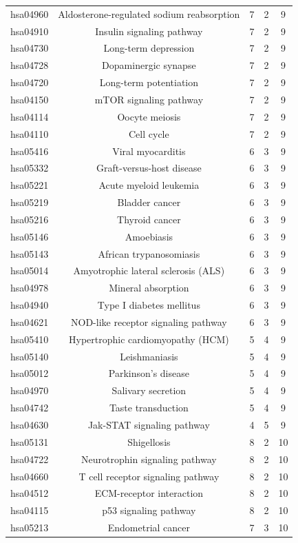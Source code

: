 \begin{center}
\begin{longtable}{@{}ccccc@{}}
hsa04960	&Aldosterone-regulated sodium reabsorption&	7&	2&	9\\
hsa04910	&Insulin signaling pathway&	7&	2&	9\\
hsa04730	&Long-term depression&	7&	2&	9\\
hsa04728	&Dopaminergic synapse&	7&	2&	9\\
hsa04720	&Long-term potentiation&	7&	2&	9\\
hsa04150	&mTOR signaling pathway&	7&	2&	9\\
hsa04114	&Oocyte meiosis&	7&	2&	9\\
hsa04110	&Cell cycle&	7&	2&	9\\
hsa05416	&Viral myocarditis&	6&	3&	9\\
hsa05332	&Graft-versus-host disease&	6&	3&	9\\
hsa05221	&Acute myeloid leukemia&	6&	3&	9\\
hsa05219	&Bladder cancer&	6&	3&	9\\
hsa05216	&Thyroid cancer&	6&	3&	9\\
hsa05146	&Amoebiasis&	6&	3&	9\\
hsa05143	&African trypanosomiasis&	6&	3&	9\\
hsa05014	&Amyotrophic lateral sclerosis (ALS)&	6&	3&	9\\
hsa04978	&Mineral absorption&	6&	3&	9\\
hsa04940	&Type I diabetes mellitus&	6&	3&	9\\
hsa04621	&NOD-like receptor signaling pathway&	6&	3&	9\\
hsa05410	&Hypertrophic cardiomyopathy (HCM)&	5&	4&	9\\
hsa05140	&Leishmaniasis	&5&	4&	9\\
hsa05012	&Parkinson's disease&	5&	4&	9\\
hsa04970	&Salivary secretion&	5&	4&	9\\
hsa04742	&Taste transduction&	5&	4&	9\\
hsa04630	&Jak-STAT signaling pathway&	4&	5&	9\\
hsa05131	&Shigellosis&	8&	2&	10\\
hsa04722	&Neurotrophin signaling pathway&	8&	2	&10\\
hsa04660	&T cell receptor signaling pathway	&8	&2&	10\\
hsa04512	&ECM-receptor interaction&	8&	2&	10\\
hsa04115	&p53 signaling pathway&	8&	2&	10\\
hsa05213	&Endometrial cancer	&7&	3&	10\\

\end{longtable}
\end{center}
